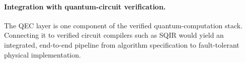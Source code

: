 \paragraph{Integration with quantum-circuit verification.}
The QEC layer is one component of the verified quantum-computation stack.
Connecting it to verified circuit compilers such as SQIR would yield an
integrated, end-to-end pipeline from algorithm specification to fault-tolerant
physical implementation.

